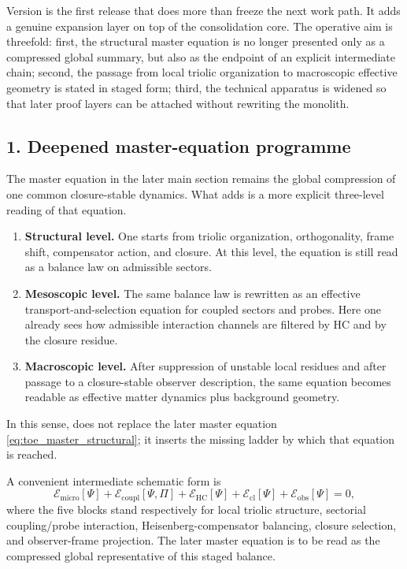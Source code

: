 Version  is the first release that does more than freeze the next
work path. It adds a genuine expansion layer on top of the 
consolidation core. The operative aim is threefold: first, the structural
master equation is no longer presented only as a compressed global summary, but
also as the endpoint of an explicit intermediate chain; second, the passage
from local triolic organization to macroscopic effective geometry is stated in
staged form; third, the technical apparatus is widened so that later proof
layers can be attached without rewriting the monolith.

\subsection*{1. Deepened master-equation programme}
The master equation in the later main section remains the global compression of
one common closure-stable dynamics. What  adds is a more explicit
three-level reading of that equation.
\begin{enumerate}[leftmargin=2em,label=(\roman*)]
 \item \textbf{Structural level.} One starts from triolic organization,
 orthogonality, frame shift, compensator action, and closure. At this level,
 the equation is still read as a balance law on admissible sectors.
 \item \textbf{Mesoscopic level.} The same balance law is rewritten as an
 effective transport-and-selection equation for coupled sectors and probes.
 Here one already sees how admissible interaction channels are filtered by HC
 and by the closure residue.
 \item \textbf{Macroscopic level.} After suppression of unstable local
 residues and after passage to a closure-stable observer description, the same
 equation becomes readable as effective matter dynamics plus background
 geometry.
\end{enumerate}
In this sense,  does not replace the later master equation
\eqref{eq:toe_master_structural}; it inserts the missing ladder by which that
equation is reached.

A convenient intermediate schematic form is
\[
\mathcal E_{\mathrm{micro}}[\Psi]
+\mathcal E_{\mathrm{coupl}}[\Psi,\Pi]
+\mathcal E_{\mathrm{HC}}[\Psi]
+\mathcal E_{\mathrm{cl}}[\Psi]
+\mathcal E_{\mathrm{obs}}[\Psi]
=0,
\]
where the five blocks stand respectively for local triolic structure, sectorial
coupling/probe interaction, Heisenberg-compensator balancing, closure
selection, and observer-frame projection. The later master equation is to be
read as the compressed global representative of this staged balance.


